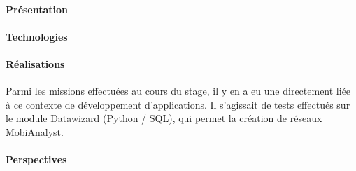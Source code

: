 \paragraph{Présentation}

\paragraph{Technologies}

\paragraph{Réalisations}
Parmi les missions effectuées au cours du stage, il y en a eu une directement liée à ce contexte de développement d’applications. Il s’agissait de tests effectués sur le module Datawizard (Python / SQL), qui permet la création de réseaux MobiAnalyst.\\

\paragraph{Perspectives}

